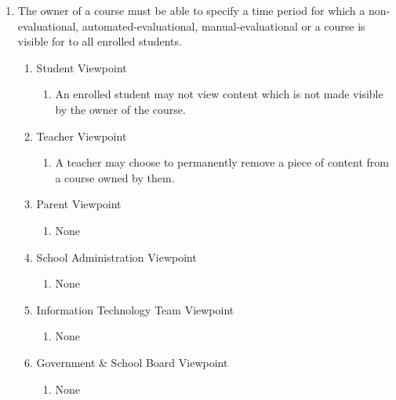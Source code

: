 \documentclass[]{article}
\begin{document}
\begin{enumerate}[{BE}1.]
	\item The owner of a course must be able to specify a time period for which a 
non-evaluational, automated-evaluational, manual-evaluational or a course is 
visible for to all enrolled students.
	\begin{enumerate}[{VP2}.1]
		\item Student Viewpoint
			\begin{enumerate}
				\item An enrolled student may not view content which is not made visible by 
the owner of the course.
			\end{enumerate}
		\item Teacher Viewpoint
			\begin{enumerate}
				\item A teacher may choose to permanently remove a piece of content from a 
course owned by them.
			\end{enumerate}
		\item Parent Viewpoint
			\begin{enumerate}
				\item None
			\end{enumerate}
		\item School Administration Viewpoint
			\begin{enumerate}
				\item None
			\end{enumerate}
		\item Information Technology Team Viewpoint
			\begin{enumerate}
				\item None
			\end{enumerate}
		\item Government \& School Board Viewpoint
			\begin{enumerate}
				\item None
			\end{enumerate}
	\end{enumerate}


\end{enumerate}
\end{document}

